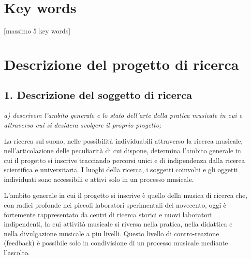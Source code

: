 \documentclass{gs-adonis}
\begin{document}
%
%


\section{Key words}

[massimo 5 key words]


\section{Descrizione del progetto di ricerca}%

\subsection{1. Descrizione del soggetto di ricerca}%

\emph{a) descrivere l’ambito generale e lo stato dell’arte della pratica musicale in cui e attraverso cui si desidera svolgere il proprio progetto;}



La ricerca sul suono, nelle possibilità individuabili attraverso la ricerca
musicale, nell'articolazione delle peculiarità di cui dispone, determina
l'ambito generale in cui il progetto si inscrive tracciando percorsi unici e di
indipendenza dalla ricerca scientifica e universitaria. I luoghi della ricerca,
i soggetti coinvolti e gli oggetti individuati sono accessibili e attivi solo
in un processo musicale.

L'ambito generale in cui il progetto si inscrive è quello della musica di
ricerca che, con radici profonde nei piccoli laboratori sperimentali del
novecento, oggi è fortemente rappresentato da centri di ricerca storici e
nuovi laboratori indipendenti, la cui attività musicale si riversa nella
pratica, nella didattica e nella divulgazione musicale a piu livelli. Questo
livello di contro-reazione (feedback) è possibile solo in condivisione di un
processo musicale mediante l'ascolto.

\end{document}
